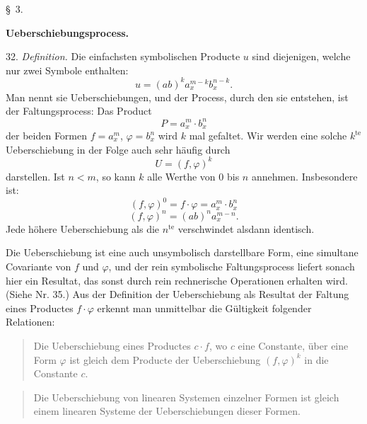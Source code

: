 
\begin{center}
\S~3.

\textbf{Ueberschiebungsprocess.}
\end{center}

32. \textit{Definition.} Die einfachsten symbolischen Producte $u$ sind
diejenigen, welche nur zwei Symbole enthalten:
\[
u = (ab)^k a_x^{m-k} b_x^{n-k}.
\]
Man nennt sie \glqq Ueberschiebungen\grqq{}, und der Process, durch den sie
entstehen, ist der Faltungsprocess: Das Product
\[
P = a_x^m \cdot b_x^n
\]
der beiden Formen $f = a_x^m$, $\varphi = b_x^n$ wird $k$ mal gefaltet. Wir
werden eine solche $k^{\text{te}}$ Ueberschiebung in der Folge auch sehr
häufig durch
\[
U = (f, \varphi)^k
\]
darstellen. Ist $n < m$, so kann $k$ alle Werthe von 0 bis $n$ annehmen.
Insbesondere ist:
\[
(f, \varphi)^0 = f \cdot \varphi = a_x^m \cdot b_x^n
\]
\[
(f, \varphi)^n = (ab)^n a_x^{m-n}.
\]
Jede höhere Ueberschiebung als die $n^{\text{te}}$ verschwindet alsdann
identisch.

Die Ueberschiebung ist eine auch unsymbolisch darstellbare Form, eine
simultane Covariante von $f$ und $\varphi$, und der rein symbolische
Faltungsprocess liefert sonach hier ein Resultat, das sonst durch rein
rechnerische Operationen erhalten wird. (Siehe Nr. 35.) Aus der Definition
der Ueberschiebung als Resultat der Faltung eines Productes $f \cdot \varphi$
erkennt man unmittelbar die Gültigkeit folgender Relationen:


\begin{quote}
\glqq Die Ueberschiebung eines Productes $c \cdot f$, wo $c$ eine
Constante, über eine Form $\varphi$ ist gleich dem Producte der
Ueberschiebung $(f, \varphi)^k$ in die Constante $c$.\grqq{}
\end{quote}


\begin{quote}
\glqq Die Ueberschiebung von linearen Systemen einzelner Formen ist gleich
einem linearen Systeme der Ueberschiebungen dieser Formen.\grqq{}
\end{quote}


